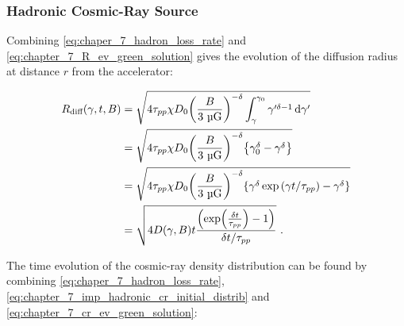 \subsubsection{Hadronic Cosmic-Ray Source}

Combining \autoref{eq:chaper_7_hadron_loss_rate} and \autoref{eq:chapter_7_R_ev_green_solution} gives the evolution of the diffusion radius at distance $r$ from the accelerator:

\begin{equation}
	\begin{aligned}
		R_\text{diff}\qty(\gamma,t,B)&=\sqrt{4\tau_{pp}\chi D_0\qty(\frac{B}{3~\si{\micro G}})^{-\delta}\int_\gamma^{\gamma_0}\gamma'^{\delta-1}\dd{\gamma'}} \\
		&=\sqrt{4\tau_{pp}\chi D_0\qty(\frac{B}{3~\si{\micro G}})^{-\delta}\qty{\gamma_0^\delta-\gamma^\delta}} \\
		&=\sqrt{4\tau_{pp}\chi D_0\qty(\frac{B}{3~\si{\micro G}})^{-\delta}\qty{\gamma^\delta\exp\qty(\gamma t/\tau_{pp})-\gamma^\delta}} \\
		&=\sqrt{4D\qty(\gamma,B)t\frac{\qty(\exp(\frac{\delta t}{\tau_{pp}})-1)}{\delta t/\tau_{pp}}}\text{ .}
	\end{aligned} \label{eq:chapter_7_Rdiff_hadronic_impulsive}
\end{equation} 

The time evolution of the cosmic-ray density distribution can be found by combining \autoref{eq:chaper_7_hadron_loss_rate}, \autoref{eq:chapter_7_imp_hadronic_cr_initial_distrib} and \autoref{eq:chapter_7_cr_ev_green_solution}:

